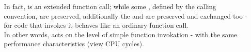 In fact, \cc is an extended function call; while some , defined by the calling convention, are preserved, additionally the
 and  are preserved and exchanged
too - for code that invokes \cc it behaves like an ordinary function call.\\
In other words, \cc acts on the level of simple function invokation - with the
same performance characteristics (view CPU cycles).
